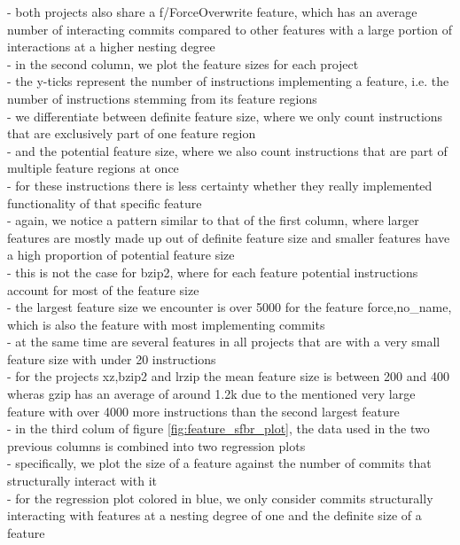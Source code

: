- both projects also share a f/ForceOverwrite feature, which has an average number of interacting commits compared to other features with a large portion of interactions at a higher nesting degree \\
- in the second column, we plot the feature sizes for each project \\
- the y-ticks represent the number of instructions implementing a feature, i.e. the number of instructions stemming from its feature regions \\
- we differentiate between definite feature size, where we only count instructions that are exclusively part of one feature region \\ 
- and the potential feature size, where we also count instructions that are part of multiple feature regions at once \\
- for these instructions there is less certainty whether they really implemented functionality of that specific feature \\
- again, we notice a pattern similar to that of the first column, where larger features are mostly made up out of definite feature size and smaller features have a high proportion of potential feature size \\
- this is not the case for bzip2, where for each feature potential instructions account for most of the feature size \\
- the largest feature size we encounter is over 5000 for the feature force,no\_name, which is also the feature with most implementing commits \\
- at the same time are several features in all projects that are with a very small feature size with under 20 instructions \\
- for the projects xz,bzip2 and lrzip the mean feature size is between 200 and 400 wheras gzip has an average of around 1.2k due to the mentioned very large feature with over 4000 more instructions than the second largest feature \\
- in the third colum of figure \ref{fig:feature_sfbr_plot}, the data used in the two previous columns is combined into two regression plots \\
- specifically, we plot the size of a feature against the number of commits that structurally interact with it \\
- for the regression plot colored in blue, we only consider commits structurally interacting with features at a nesting degree of one and the definite size of a feature \\
